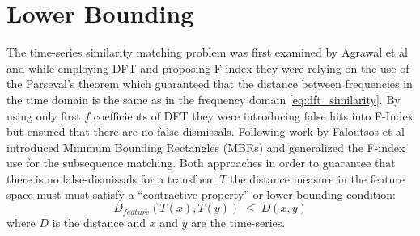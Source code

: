 \section{Lower Bounding}
The time-series similarity matching problem was first examined by Agrawal et al \cite{citeulike:3973409} and while employing DFT and proposing F-index they were relying on the use of the Parseval's theorem which guaranteed that the distance between frequencies in the time domain is the same as in the frequency domain \ref{eq:dft_similarity}. By using only first $f$ coefficients of DFT they were introducing false hits into F-Index but ensured that there are no false-dismissals. Following work by Faloutsos et al \cite{citeulike:825581} introduced Minimum Bounding Rectangles (MBRs) and generalized the F-index use for the subsequence matching. Both approaches in order to guarantee that there is no false-dismissals for a transform $T$ the distance measure in the feature space must must satisfy a ``contractive property'' or lower-bounding condition:
\begin{equation}
D_{feature}(T(x),T(y)) \; \leq \; D(x,y) 
\label{eq:bounding}
\end{equation}
where $D$ is the distance and $x$ and $y$ are the time-series.